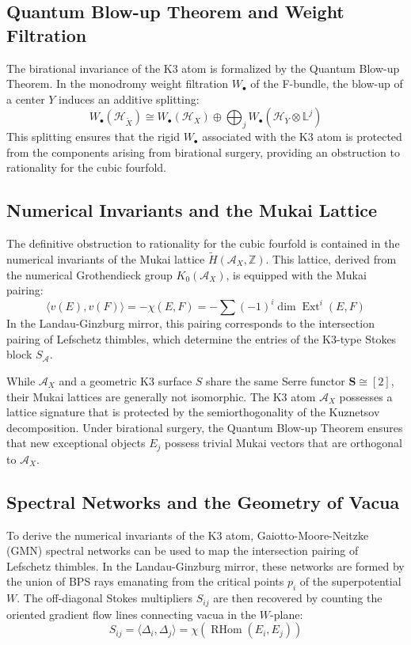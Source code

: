 \documentclass[12pt,reqno]{amsart}
\theoremstyle{remark} \newtheorem{remark}[theorem]{Remark}
\begin{document}
\subsection{Quantum Blow-up Theorem and Weight Filtration}
The birational invariance of the K3 atom is formalized by the Quantum
Blow-up Theorem. In the monodromy weight filtration $W_\bullet$ of the
F-bundle, the blow-up of a center $Y$ induces an additive splitting:
\begin{equation}
    W_\bullet(\mathcal{H}_{\tilde{X}}) \cong
    W_\bullet(\mathcal{H}_{X}) \oplus \bigoplus_{j}
    W_\bullet(\mathcal{H}_{Y} \otimes \mathbb{L}^j)
\end{equation}
This splitting ensures that the rigid $W_\bullet$ associated with the
K3 atom is protected from the components arising from birational surgery,
providing an obstruction to rationality for the
cubic fourfold.
\subsection{Numerical Invariants and the Mukai Lattice}
The definitive obstruction to rationality for the cubic fourfold is
contained in the numerical invariants of the Mukai lattice
$\tilde{H}(\mathcal{A}_X, \mathbb{Z})$. This lattice, derived from the
numerical Grothendieck group $K_0(\mathcal{A}_X)$, is equipped with
the Mukai pairing:
\begin{equation} 
  \langle v(E), v(F) \rangle = - \chi (E,F) = -\sum (-1)^i \dim \operatorname{Ext}^i(E, F)
\end{equation}
In the Landau-Ginzburg mirror, this pairing corresponds to
the intersection pairing of Lefschetz thimbles, which determine the
entries of the K3-type Stokes block $S_{\mathcal{A}}$.

While $\mathcal{A}_X$ and a geometric K3 surface $S$ share the same
Serre functor $\mathbf{S} \cong [2]$, their Mukai lattices are generally not
isomorphic. The K3 atom $\mathcal{A}_X$ possesses a lattice signature
that is protected by the semiorthogonality of the Kuznetsov
decomposition. Under birational surgery, the Quantum Blow-up Theorem
ensures that new exceptional objects $E_j$ possess trivial Mukai
vectors that are orthogonal to
$\mathcal{A}_X$.

\subsection{Spectral Networks and the Geometry of Vacua}
To derive the numerical invariants of the K3 atom, Gaiotto-Moore-Neitzke (GMN) spectral networks \cite{GMN2013, GMN2013b, GMN2009} can be used
to map the intersection
pairing of Lefschetz thimbles. In the Landau-Ginzburg mirror, these
networks are formed by the union of BPS rays emanating from the
critical points $p_i$ of the superpotential $W$. The off-diagonal
Stokes multipliers $S_{ij}$ are then recovered by counting the oriented
gradient flow lines connecting vacua in the $W$-plane:
\begin{equation}
    S_{ij} = \langle \Delta_i, \Delta_j \rangle =
    \chi(\operatorname{RHom}(E_i, E_j))
\end{equation}
\end{document}
